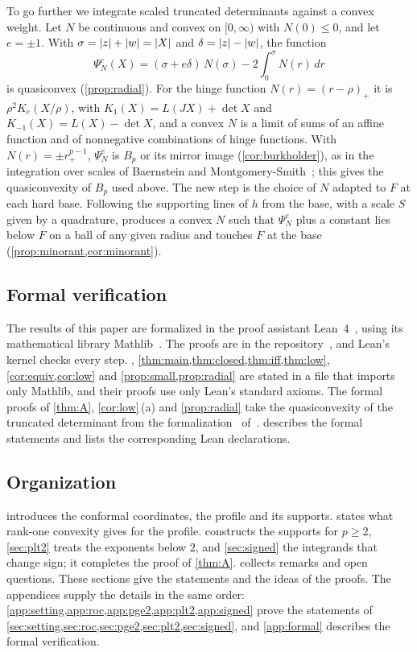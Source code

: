 \begin{enumerate}[label=\textup{(\arabic*)}]
  To go further we integrate scaled truncated determinants against a convex weight. Let $N$ be
  continuous and convex on $[0,\infty)$ with $N(0)\le0$, and let $e=\pm1$. With
  $\sigma=\lvert z\rvert+\lvert w\rvert=\lvert X\rvert$ and $\delta=\lvert z\rvert-\lvert w\rvert$, the function
  \[
    \Psi^e_N(X)=(\sigma+e\delta)\,N(\sigma)-2\int_0^\sigma N(r)\,dr
  \]
  is quasiconvex (\cref{prop:radial}). For the hinge function $N(r)=(r-\rho)_+$ it is
  $\rho^2K_e(X/\rho)$, with $K_1(X)=L(JX)+\det X$ and $K_{-1}(X)=L(X)-\det X$, and a convex $N$
  is a limit of sums of an affine function and of nonnegative combinations of hinge functions.
  With $N(r)=\pm r_+^{p-1}$, $\Psi^e_N$ is $B_p$ or its mirror image (\cref{cor:burkholder}), as
  in the integration over scales of Baernstein and
  Montgomery-Smith~\cite{BaernsteinMontgomerySmith1999}; this gives the quasiconvexity of $B_p$
  used above. The new step is the choice of
  $N$ adapted to $F$ at each hard base. Following the supporting lines of $h$ from the base,
  with a scale $S$ given by a quadrature, produces a convex $N$ such that $\Psi^e_N$ plus a
  constant lies below $F$ on a ball of any given radius and touches $F$ at the base
  (\cref{prop:minorant,cor:minorant}).
\end{enumerate}

\subsection{Formal verification}\label{sec:intro-formal}

The results of this paper are formalized in the proof assistant Lean~4~\cite{Lean4}, using its
mathematical library Mathlib~\cite{Mathlib20}. The proofs are in the repository~\cite{Companion},
and Lean's kernel checks every step. , \cref{thm:main,thm:closed,thm:iff,thm:low},
\cref{cor:equiv,cor:low} and \cref{prop:small,prop:radial} are stated in a file that imports
only Mathlib, and their proofs use only Lean's standard axioms. The formal proofs of
\cref{thm:A}, \cref{cor:low}\,(a) and \cref{prop:radial} take the quasiconvexity of the truncated
determinant from the formalization~\cite{IwaniecLean} of~\cite{SharpHI}. 
describes the formal statements and lists the corresponding Lean declarations.

\subsection{Organization}\label{sec:intro-organization}

 introduces the conformal coordinates, the profile and its supports.
 states what rank-one convexity gives for the profile.  constructs
the supports for $p\ge2$, \cref{sec:plt2} treats the exponents below $2$, and \cref{sec:signed}
the integrands that change sign; it completes the proof of \cref{thm:A}. 
collects remarks and open questions. These sections give the statements and the ideas of the
proofs. The appendices supply the details in the same order:
\cref{app:setting,app:roc,app:pge2,app:plt2,app:signed} prove the statements of
\cref{sec:setting,sec:roc,sec:pge2,sec:plt2,sec:signed}, and \cref{app:formal} describes the
formal verification.
